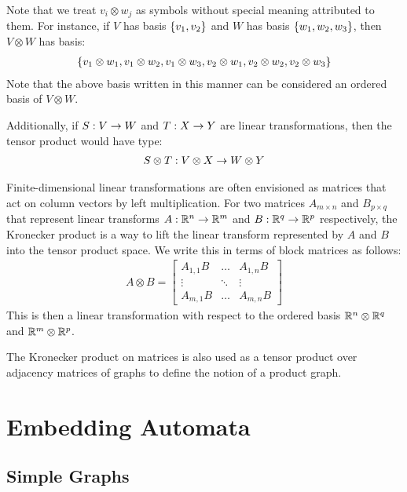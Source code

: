 \documentclass[12pt]{article}
\begin{document}
Note that we treat \(v_i \otimes w_j\)
as symbols without special meaning attributed to them.
For instance, if \(V\) has basis \(\left\{v_1, v_2\right\}\)
and \(W\) has basis \(\left\{w_1, w_2, w_3\right\}\),
then \(V \otimes W\) has basis:
\begin{align}
  \left\{v_1 \otimes w_1, v_1 \otimes w_2, v_1 \otimes w_3,
          v_2 \otimes w_1, v_2 \otimes w_2, v_2 \otimes w_3\right\}
\end{align}
Note that the above basis written in this manner can be considered
an ordered basis of \(V \otimes W\).

Additionally, if \(S : V \to W\) and \(T : X \to Y\)
are linear transformations,
then the tensor product would have type:
\begin{align}
  S \otimes T : V \otimes X \to W \otimes Y
\end{align}

Finite-dimensional linear transformations are often envisioned
as matrices that act on column vectors by left multiplication.
For two matrices \(A_{m \times n}\) and \(B_{p \times q}\)
that represent linear transforms
\(A : \mathbb{R}^n \to \mathbb{R}^m\) and \(B : \mathbb{R}^q \to \mathbb{R}^p\) respectively,
the Kronecker product is a way to lift the linear
transform represented by \(A\) and \(B\) into the tensor product space.
We write this in terms of block matrices as follows:
\begin{align}
  {A \otimes B}
    = \begin{bmatrix}
        A_{1, 1} B & \ldots & A_{1, n} B \\
        \vdots & \ddots & \vdots \\
        A_{m, 1} B & \ldots & A_{m, n} B
      \end{bmatrix}
\end{align}
This is then a linear transformation with respect to the ordered basis
\(\mathbb{R}^n \otimes \mathbb{R}^q\) and \(\mathbb{R}^m \otimes \mathbb{R}^p\).

The Kronecker product on matrices is also used as a tensor product over
adjacency matrices of graphs to define the notion of a product graph.



\section{Embedding Automata}


\subsection{Simple Graphs}
\end{document}
